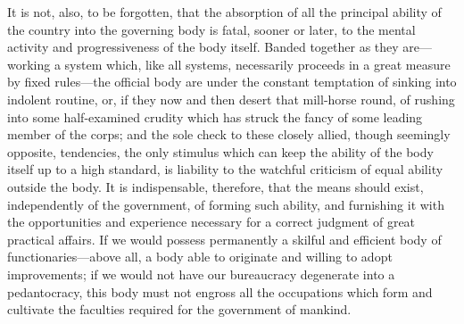 \documentclass[11pt,openany]{book}
\begin{document}
It is not, also, to be forgotten, that the absorption of all the principal ability of the country into the governing body is fatal, sooner or later, to the mental activity and progressiveness of the body itself. Banded together as they are---working a system which, like all systems, necessarily proceeds in a great measure by fixed rules---the official body are under the constant temptation of sinking into indolent routine, or, if they now and then desert that mill-horse round, of rushing into some half-examined crudity which has struck the fancy of some leading member of the corps; and the sole check to these closely allied, though seemingly opposite, tendencies, the only stimulus which can keep the ability of the body itself up to a high standard, is liability to the watchful criticism of equal ability outside the body. It is indispensable, therefore, that the means should exist, independently of the government, of forming such ability, and furnishing it with the opportunities and experience necessary for a correct judgment of great practical affairs. If we would possess permanently a skilful and efficient body of functionaries---above all, a body able to originate and willing to adopt improvements; if we would not have our bureaucracy degenerate into a pedantocracy, this body must not engross all the occupations which form and cultivate the faculties required for the government of mankind.
\end{document}
